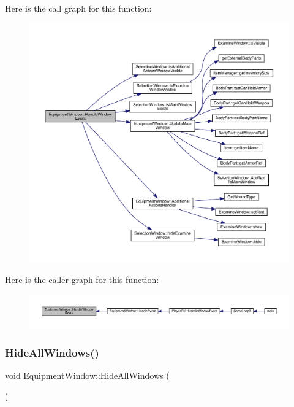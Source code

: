 Here is the call graph for this function\+:
\nopagebreak
\begin{figure}[H]
\begin{center}
\leavevmode
\includegraphics[width=350pt]{d8/dcb/class_equipment_window_a51ce202b7d1c4ac4e0e7d93df9dec726_cgraph}
\end{center}
\end{figure}
Here is the caller graph for this function\+:
\nopagebreak
\begin{figure}[H]
\begin{center}
\leavevmode
\includegraphics[width=350pt]{d8/dcb/class_equipment_window_a51ce202b7d1c4ac4e0e7d93df9dec726_icgraph}
\end{center}
\end{figure}
\mbox{\label{class_equipment_window_a9ff317935c0c7698a4cde661348ad059}} 
\subsubsection{\texorpdfstring{Hide\+All\+Windows()}{HideAllWindows()}}
{\footnotesize\ttfamily void Equipment\+Window\+::\+Hide\+All\+Windows (\begin{DoxyParamCaption}{ }\end{DoxyParamCaption})\hspace{0.3cm}{\ttfamily [virtual]}}



